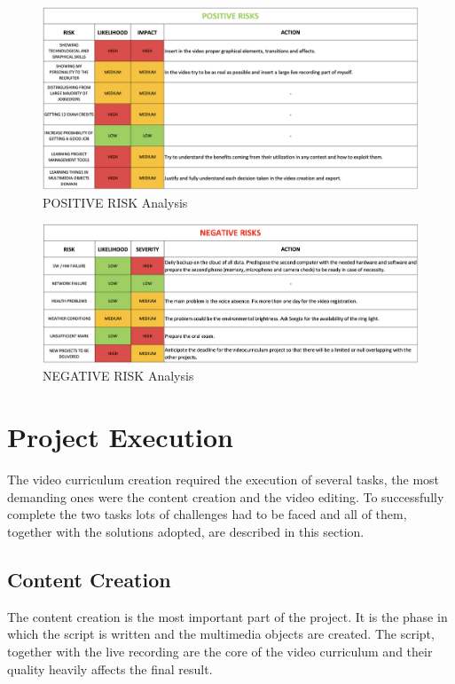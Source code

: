 \documentclass{article}
\begin{document}
\begin{multicols}{2}
        \begin{figure}[H]
            \centering
            \includegraphics[width=1\textwidth]{POSITIVE RISK.png}
            \caption{POSITIVE RISK Analysis}
            \label{fig:risk_pos}
        \end{figure}

        \vspace{-0.1cm}

        \begin{figure}[H]
            \centering
            \includegraphics[width=1\textwidth]{NEGATIVE RISK.png}
            \caption{NEGATIVE RISK Analysis}
            \label{fig:risk_neg}
        \end{figure}

        
    \noindent

\section{Project Execution}
The video curriculum creation required the execution of several tasks, the most demanding ones were the content creation and the video editing. To successfully complete the two tasks lots of challenges
had to be faced and all of them, together with the solutions adopted, are described in this section.

    \subsection{Content Creation}
    The content creation is the most important part of the project. It is the phase in which the script is written and the multimedia objects are created. 
    \clearpage
    \noindent
    The script, together with the live recording 
    are the core of the video curriculum and their quality heavily affects the final result.


\end{multicols}
\end{document}
